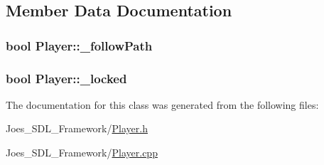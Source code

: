 \subsection{Member Data Documentation}
\hypertarget{class_player_a8e8d189f49c664445fba0976115bb030}{
\subsubsection[{\-\_\-follow\-Path}]{\setlength{\rightskip}{0pt plus 5cm}bool Player\-::\-\_\-follow\-Path}}\label{class_player_a8e8d189f49c664445fba0976115bb030}
\hypertarget{class_player_a39c12b1c083f02ba270fd7c2c4d48e42}{
\subsubsection[{\-\_\-locked}]{\setlength{\rightskip}{0pt plus 5cm}bool Player\-::\-\_\-locked\hspace{0.3cm}{\ttfamily [static]}}}\label{class_player_a39c12b1c083f02ba270fd7c2c4d48e42}


The documentation for this class was generated from the following files\-:\begin{DoxyCompactItemize}
\item 
Joes\-\_\-\-S\-D\-L\-\_\-\-Framework/\hyperlink{_player_8h}{Player.\-h}\item 
Joes\-\_\-\-S\-D\-L\-\_\-\-Framework/\hyperlink{_player_8cpp}{Player.\-cpp}\end{DoxyCompactItemize}
